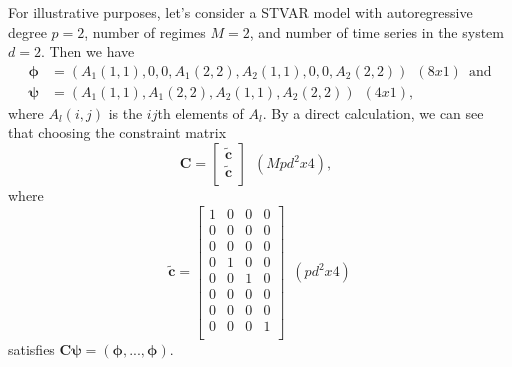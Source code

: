 \documentclass[nojss]{jss}
\begin{document}
For illustrative purposes, let's consider a STVAR model with autoregressive degree $p=2$, number of regimes $M=2$, and number of time series in the system $d=2$. Then we have
\begin{align}
\boldsymbol{\phi}&=(A_1(1,1),0,0,A_1(2,2),A_2(1,1),0,0,A_2(2,2)) \enspace (8x1) \enspace \text{and}\\
\boldsymbol{\psi}&=(A_1(1,1),A_1(2,2),A_2(1,1),A_2(2,2)) \enspace (4x1),
\end{align}
where $A_l(i,j)$ is the $ij$th elements of $A_l$. By a direct calculation, we can see that choosing the constraint matrix
\begin{equation}
\boldsymbol{C}=\left[{\begin{array}{c}
   \boldsymbol{\tilde{c}} \\
   \boldsymbol{\tilde{c}} \\
  \end{array}}\right]
\enspace (Mpd^2x4),
\enspace
\end{equation}
where
\begin{equation}
\boldsymbol{\tilde{c}}=\left[{\begin{array}{cccc}
   1 & 0 & 0 & 0 \\
   0 & 0 & 0 & 0 \\
   0 & 0 & 0 & 0 \\
   0 & 1 & 0 & 0 \\
   0 & 0 & 1 & 0 \\
   0 & 0 & 0 & 0 \\
   0 & 0 & 0 & 0 \\
   0 & 0 & 0 & 1 \\
  \end{array}}\right]
\enspace (pd^2x4)
\end{equation}
satisfies $\boldsymbol{C}\boldsymbol{\psi}=(\boldsymbol{\phi},...,\boldsymbol{\phi}).$
\end{document}
